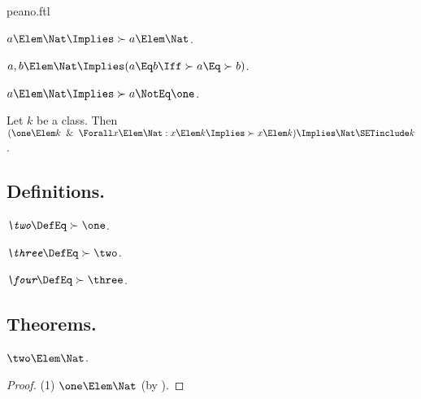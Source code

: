\documentclass{stex}
\begin{document}
\begin{smodule}{peano.ftl}
\begin{forthel}
  \begin{axiom*}[title=6,name=P6]
    $a \Elem \Nat \Implies \succ{a} \Elem \Nat$.
  \end{axiom*}
  
  \begin{axiom*}[title=7,name=P7]
    $a,b \Elem \Nat \Implies (a \Eq b \Iff \succ{a} \Eq \succ{b})$.
  \end{axiom*}
  
  \begin{axiom*}[title=8,name=P8]
    $a \Elem \Nat \Implies \succ{a} \NotEq \one$.
  \end{axiom*}
  
  \begin{axiom*}[title=9,name=P9]
    Let $k$ be a class.
    Then $(\one \Elem k \And \Forall x \Elem \Nat: x \Elem k \Implies \succ{x} \Elem k) \Implies\linebreak \Nat \SETinclude k$.
  \end{axiom*}
\end{forthel}


\subsection{Definitions.}

\begin{forthel}
  \begin{definition*}[title=10.i,for=two]
    $\emph{\two} \DefEq \succ{\one}$.
  \end{definition*}

  \begin{definition*}[title=10.ii,for=three]
    $\emph{\three} \DefEq \succ{\two}$.
  \end{definition*}
  
  \begin{definition*}[title=10.iii,for=four]
    $\emph{\four} \DefEq \succ{\three}$.
  \end{definition*}
\end{forthel}


\subsection{Theorems.}


\begin{forthel}
  \begin{theorem*}[title=11,name=P11]
    $\two \Elem \Nat$.
  \end{theorem*}
  \begin{proof}
    (1) $\one \Elem \Nat$ (by ).


\end{proof}
\end{forthel}
\end{smodule}
\end{document}
